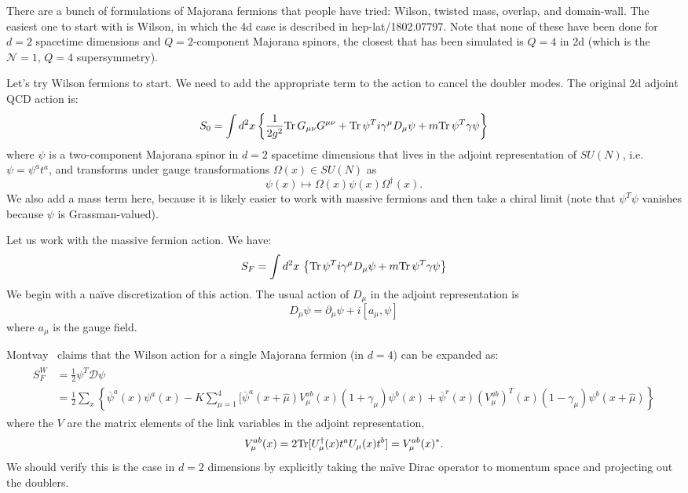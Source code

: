There are a bunch of formulations of Majorana fermions that people have tried: Wilson, twisted mass, overlap, and domain-wall. The easiest one to start with is Wilson, in which the 4d case is described in hep-lat/1802.07797. Note that none of these have been done for $d = 2$ spacetime dimensions and $Q=2$-component Majorana spinors, the closest that has been simulated is $Q = 4$ in 2d (which is the $\mathcal N = 1$, $Q = 4$ supersymmetry). 

Let's try Wilson fermions to start. We need to add the appropriate term to the action to cancel the doubler modes. The original 2d adjoint QCD action is:
\begin{equation}
	S_0 = \int d^2 x \left\{ \frac{1}{2g^2} \mathrm{Tr}\, G_{\mu\nu} G^{\mu\nu} + \mathrm{Tr}\, \psi^T i\gamma^\mu D_\mu \psi + m \mathrm{Tr}\, \psi^T \gamma \psi \right\}
\end{equation}
where $\psi$ is a two-component Majorana spinor in $d = 2$ spacetime dimensions that lives in the adjoint representation of $SU(N)$, i.e. $\psi = \psi^a t^a$, and transforms under gauge transformations $\Omega(x)\in SU(N)$ as
\begin{equation}
	\psi(x)\mapsto \Omega(x) \psi(x) \Omega^\dagger(x).
\end{equation}
We also add a mass term here, because it is likely easier to work with massive fermions and then take a chiral limit (note that $\psi^T \psi$ vanishes because $\psi$ is Grassman-valued). 

Let us work with the massive fermion action. We have:
\begin{equation}
	S_F = \int d^2 x\, \left\{ \mathrm{Tr}\, \psi^T i\gamma^\mu D_\mu \psi + m\mathrm{Tr}\, \psi^T\gamma\psi \right\}
\end{equation}
We begin with a na\"ive discretization of this action. The usual action of $D_\mu$ in the adjoint representation is
\begin{equation}
	D_\mu \psi = \partial_\mu \psi + i [a_\mu, \psi]
\end{equation}
where $a_\mu$ is the gauge field. 

Montvay~\cite{Montvay:2001ry} claims that the Wilson action for a single Majorana fermion (in $d = 4$) can be expanded as:
\begin{align}\begin{split}
	S_F^W &= \frac{1}{2} \psi^T \mathcal D \psi \\&= \frac{1}{2} \sum_x \left\{ \overline \psi^a(x) \psi^a(x) - K \sum_{\mu = 1}^4 [\overline\psi^a(x + \hat\mu) V^{ab}_\mu(x) (1 + \gamma_\mu) \psi^b(x) + \overline\psi^r(x) (V_\mu^{ab})^T (x) (1 - \gamma_\mu) \psi^b(x + \hat\mu) \right\}
\end{split}\end{align}
where the $V$ are the matrix elements of the link variables in the adjoint representation,
\begin{equation}
	V^{ab}_\mu(x) = 2\mathrm{Tr}[U_\mu^\dagger(x) t^a U_\mu(x) t^b] = V_\mu^{ab}(x)^*.
\end{equation}
We should verify this is the case in $d = 2$ dimensions by explicitly taking the na\"ive Dirac operator to momentum space and projecting out the doublers. 

